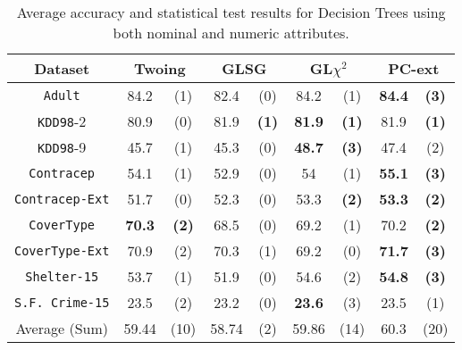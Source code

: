 \begin{table}
\small
\caption{Average accuracy and statistical test results for  Decision Trees using both nominal and numeric attributes.}
\centering
\begin{tabular}{c|cc|cc|cc|cc} 
Dataset            &\multicolumn{2}{c|}{Twoing} & \multicolumn{2}{c|}{GLSG} & \multicolumn{2}{c|}{GL$\chi^2$} & \multicolumn{2}{c}{PC-ext}\\  \hline   
{\tt Adult}        & 84.2           & (1)       & 82.4       & (0)          &  84.2       & (1)               & {\bf 84.4 } & {\bf (3) }  \\
{\tt KDD98}-2      & 80.9           & (0)       & 81.9       & {\bf (1)}    & {\bf 81.9 } & {\bf (1)}         & 81.9        & {\bf (1) }  \\ 
{\tt KDD98}-9      & 45.7           & (1)       & 45.3       &  (0)         & {\bf 48.7 } & {\bf (3)  }       &  47.4       & (2)         \\ 
{\tt Contracep}    & 54.1           & (1)       & 52.9       &  (0)         & 54          & (1)               & {\bf 55.1 } & {\bf (3) }  \\ 
{\tt Contracep-Ext}& 51.7           & (0)       & 52.3       &  (0)         & 53.3        & {\bf (2)  }       & {\bf 53.3 } & {\bf (2) }  \\ 
{\tt CoverType}    &  {\bf 70.3 }   & {\bf (2)} & 68.5       &  (0)         & 69.2        & (1)               &  70.2       & {\bf (2) }  \\ 
{\tt CoverType-Ext}& 70.9           & (2)       & 70.3       &  (1)         & 69.2        & (0)               & {\bf 71.7 } & {\bf (3) }  \\ 
{\tt Shelter-15}   & 53.7           & (1)       & 51.9       &  (0)         & 54.6        & (2)               & {\bf 54.8 } & {\bf (3) }  \\   
{\tt S.F. Crime-15}& 23.5           & (2)       & 23.2       &  (0)         & {\bf 23.6 } & (3)               & 23.5        & (1)         \\ 
\hline
Average (Sum)      & 59.44          & (10)      & 58.74      &  (2)         & 59.86       & (14)              & 60.3        & (20)

\end{tabular}
\label{exp:numeric-5}
\normalsize
\end{table}



